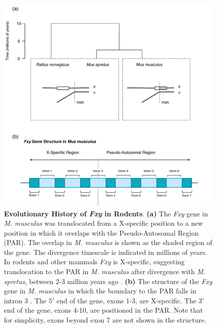 \begin{figure}[htbp]
\centering
\includegraphics[width=\textwidth]{figures/diagrams/Fxy.pdf}
\caption[Evolutionary History of \textit{Fxy} in Rodents]{\textbf{Evolutionary History of \textit{Fxy} in Rodents}. \textbf{(a)} The \textit{Fxy} gene in \textit{M. musculus} was translocated from a X-specific position to a new position in which it overlaps with the Pseudo-Autosomal Region (PAR). The overlap in \textit{M. musculus} is shown as the shaded region of the gene.  The divergence timescale is indicated in millions of years. In rodents and other mammals \textit{Fxy} is X-specific, suggesting translocation to the PAR in \textit{M. musculus} after divergence with \textit{M. spretus}, between 2-3 million years ago \citep[adapted from Figure 1][]{Galtier2007AdaptationEvolution}. \textbf{(b)} The structure of the \textit{Fxy} gene in \textit{M. musculus} in which the boundary to the PAR falls in intron 3 \citep{Palmer1997AMice}. The $5'$ end of the gene, exons 1-3, are X-specific. The $3'$ end of the gene, exons 4-10, are positioned in the PAR. Note that for simplicity, exons beyond exon 7 are not shown in the structure. }
\label{fig:Fxy}
\end{figure}